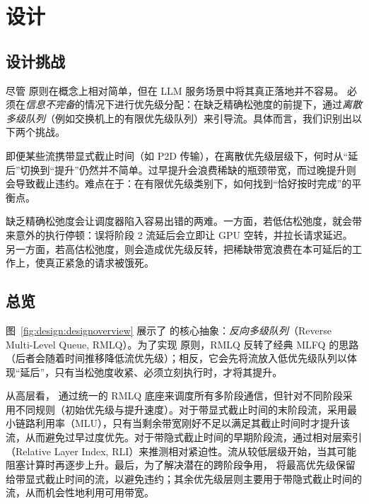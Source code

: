 \section{设计}

\subsection{设计挑战}

尽管 \DAP{} 原则在概念上相对简单，但在 LLM 服务场景中将其真正落地并不容易。\sys{} 必须在\emph{信息不完备}的情况下进行优先级分配：在缺乏精确松弛度的前提下，通过\emph{离散多级队列}（例如交换机上的有限优先级队列）来引导流。具体而言，我们识别出以下两个挑战。

即便某些流携带显式截止时间（如 P2D 传输），在离散优先级层级下，何时从“延后”切换到“提升”仍然并不简单。过早提升会浪费稀缺的瓶颈带宽，而过晚提升则会导致截止违约。难点在于：在有限优先级类别下，如何找到“恰好按时完成”的平衡点。

缺乏精确松弛度会让调度器陷入容易出错的两难。一方面，若低估松弛度，就会带来意外的执行停顿：误将阶段 2 流延后会立即让 GPU 空转，并拉长请求延迟。另一方面，若高估松弛度，则会造成优先级反转，把稀缺带宽浪费在本可延后的工作上，使真正紧急的请求被饿死。



\subsection{总览} 图~\ref{fig:design:designoverview} 展示了 \sys{} 的核心抽象：\emph{反向多级队列}（Reverse Multi-Level Queue, RMLQ）。为了实现 \DAP{} 原则，RMLQ 反转了经典 MLFQ 的思路（后者会随着时间推移降低流优先级）；相反，它会先将流放入低优先级队列以体现“延后”，只有当松弛度收紧、必须立刻执行时，才将其提升。

从高层看，\sys{} 通过统一的 RMLQ 底座来调度所有多阶段通信，但针对不同阶段采用不同规则（初始优先级与提升速度）。对于带显式截止时间的末阶段流，\sys 采用最小链路利用率（MLU），只有当剩余带宽刚好不足以满足其截止时间时才提升该流，从而避免过早过度优先。对于带隐式截止时间的早期阶段流，\sys 通过相对层索引（Relative Layer Index, RLI）来推测相对紧迫性。流从较低层级开始，当其可能阻塞计算时再逐步上升。最后，为了解决潜在的跨阶段争用，\sys{} 将最高优先级保留给带显式截止时间的流，以避免违约；其余优先级层则主要用于带隐式截止时间的流，从而机会性地利用可用带宽。

